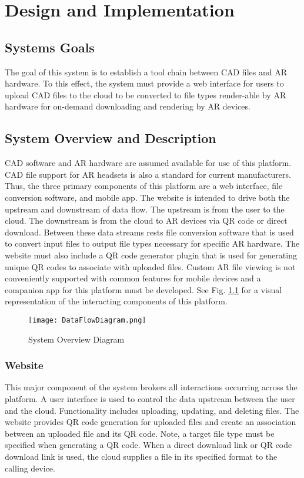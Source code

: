 
\chapter{Design  and Implementation}

\section{Systems Goals}
The goal of this system is to establish a tool chain between CAD files and AR hardware. To this effect, the system must provide a web interface for users to upload CAD files to the cloud to be converted to file types render-able by AR hardware for on-demand downloading and rendering by AR devices.  

\section{System Overview and Description}

CAD software and AR hardware are assumed available for use of this platform. CAD file support for AR headsets is also a standard for current manufacturers. Thus, the three primary components of this platform are a web interface, file conversion software, and mobile app. The website is intended to drive both the upstream and downstream of data flow. The upstream is from the user to the cloud. The downstream is from the cloud to AR devices via QR code or direct download. Between these data streams rests file conversion software that is used to convert input files to output file types necessary for specific AR hardware. The website must also include a QR code generator plugin that is used for generating unique QR codes to associate with uploaded files. Custom AR file viewing is not conveniently supported with common features for mobile devices and a companion app for this platform must be developed. See Fig. \ref{fig:UMLSystemOverview} for a visual representation of the interacting components of this platform.

\begin{figure}[H]
	\centering
	\texttt{[image: DataFlowDiagram.png]}
	\caption{System Overview Diagram} 
	\label{fig:UMLSystemOverview}	
\end{figure}

\subsection{Website}
This major component of the system brokers all interactions occurring across the platform. A user interface is used to control the data upstream between the user and the cloud. Functionality includes uploading, updating, and deleting files. The website provides QR code generation for uploaded files and create an association between an uploaded file and its QR code. Note, a target file type must be specified when generating a QR code. When a direct download link or QR code download link is used, the cloud supplies a file in its specified format to the calling device. 


